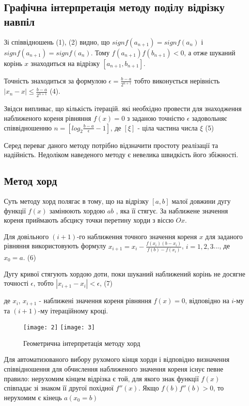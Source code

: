 \documentclass{article}
\begin{document}
\begin{normalsize}
	\subsection*{Графічна інтерпретація методу поділу відрізку навпіл}
	
	Зі співвідношень (1), (2) видно, що $sign f(a_{n+1}) = sign f(a_{n})$ і $sign f(a_{n+1}) = sign f(a_{n})$. Тому $f(a_{n+1})f(b_{n+1})<0$, а отже шуканий корінь $x$ знаходиться на відрізку $[a_{n+1}, b_{n+1}]$. 
	
	Точність знаходиться за формулою $\epsilon = \frac{b-a}{2^{n+1}}$ тобто виконується нерівність $|x_n - x| \leq\frac{b-a}{2^{n+1}}$ (4).
	
	Звідси випливає, що кількість ітерацій. які необхідно провести для знаходження наближеного кореня рівняння $f(x) = 0$ з заданою точністю $\epsilon$ задовольняє співвідношенню $n = [log_2\frac{b-a}{\epsilon}-1]$, де $[\xi]$ - ціла частина числа $\xi$ (5)
	
	Серед переваг даного методу потрібно відзначити простоту реалізації та надійність. Недоліком наведеного методу є невелика швидкість його збіжності.
	
	\subsection*{Метод хорд}
	
	Суть методу хорд полягає в тому, що на відрізку $[a, b]$ малої довжини дугу функції $f(x)$ замінюють хордою $ab$ , яка її стягує. За наближене значення кореня приймають   абсцису точки перетину хорди з віссю $Ox$.
	
	Для довільного $(i + 1)$-го наближення точного значення кореня  $x$ для заданого рівняння використовують формулу $x_{i+1}=x_i-\frac{f(x_i)(b-x_i)}{f(b)-f(x_i)}$, $i = 1, 2, 3$..., де $x_0 = a$. (6)
	
	Дугу кривої стягують хордою доти, поки шуканий наближений корінь не досягне точності $\epsilon$, тобто $|x_{i+1}-x_i| < \epsilon$, (7)
	
	де $x_i$, $x_{i+1}$ - наближені значення кореня рівняння $f(x) = 0$, відповідно на $i$-му та $(i+1)$-му ітераційному кроці.
	
	\begin{figure}[h!]
		\centering
		\texttt{[image: 2]}
		\hfill
		\texttt{[image: 3]}
		\caption{Геометрична інтерпретація методу хорд}
	\end{figure}

	Для автоматизованого вибору рухомого кінця хорди і відповідно визначення співвідношення для обчислення наближеного значення кореня існує певне правило: нерухомим кінцем відрізка є той, для якого знак функції $f(x)$ співпадає зі знаком її другої похідної $f''(x)$. Якщо $f(b)f''(b) > 0$, то нерухомим є кінець $a(x_0 = b)$


\end{normalsize}
\end{document}
